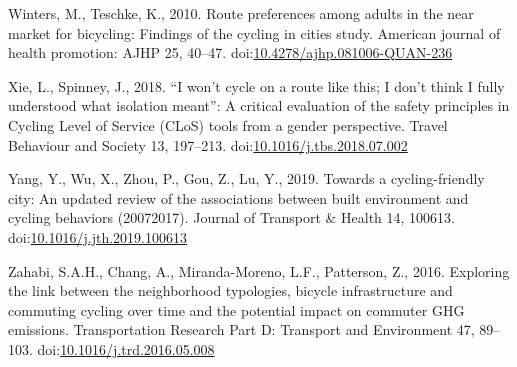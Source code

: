 \documentclass[]{elsarticle} %
\begin{document}
\leavevmode\hypertarget{ref-wintersRoutePreferencesAdults2010}{}%
Winters, M., Teschke, K., 2010. Route preferences among adults in the
near market for bicycling: Findings of the cycling in cities study.
American journal of health promotion: AJHP 25, 40--47.
doi:\href{https://doi.org/10.4278/ajhp.081006-QUAN-236}{10.4278/ajhp.081006-QUAN-236}

\leavevmode\hypertarget{ref-xieWonCycleRoute2018}{}%
Xie, L., Spinney, J., 2018. ``I won't cycle on a route like this; I
don't think I fully understood what isolation meant'': A critical
evaluation of the safety principles in Cycling Level of Service (CLoS)
tools from a gender perspective. Travel Behaviour and Society 13,
197--213.
doi:\href{https://doi.org/10.1016/j.tbs.2018.07.002}{10.1016/j.tbs.2018.07.002}

\leavevmode\hypertarget{ref-yangCyclingfriendlyCityUpdated2019}{}%
Yang, Y., Wu, X., Zhou, P., Gou, Z., Lu, Y., 2019. Towards a
cycling-friendly city: An updated review of the associations between
built environment and cycling behaviors (20072017). Journal of Transport
\& Health 14, 100613.
doi:\href{https://doi.org/10.1016/j.jth.2019.100613}{10.1016/j.jth.2019.100613}

\leavevmode\hypertarget{ref-zahabiExploringLinkNeighborhood2016b}{}%
Zahabi, S.A.H., Chang, A., Miranda-Moreno, L.F., Patterson, Z., 2016.
Exploring the link between the neighborhood typologies, bicycle
infrastructure and commuting cycling over time and the potential impact
on commuter GHG emissions. Transportation Research Part D: Transport and
Environment 47, 89--103.
doi:\href{https://doi.org/10.1016/j.trd.2016.05.008}{10.1016/j.trd.2016.05.008}
\end{document}
